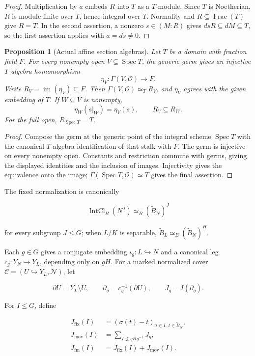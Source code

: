 \documentclass[11pt]{article}
\newtheorem{proposition}[theorem]{Proposition}
\theoremstyle{definition}
\theoremstyle{remark}
\DeclareMathOperator{\Spec}{Spec}
\DeclareMathOperator{\Frac}{Frac}
\begin{document}
\begin{proof}
Multiplication by \(a\) embeds \(R\) into \(T\) as a \(T\)-module.
Since \(T\) is Noetherian, \(R\) is module-finite over \(T\), hence
integral over \(T\). Normality and \(R\subseteq\Frac(T)\) give
\(R=T\). In the second assertion, a nonzero \(s\in(M:R)\) gives
\(dsR\subseteq dM\subseteq T\), so the first assertion applies with
\(a=ds\ne0\).
\end{proof}

\begin{proposition}[Actual affine section algebras]
\label{prop:affine-section-algebra}
Let \(T\) be a domain with fraction field \(F\). For every nonempty
open \(V\subseteq\Spec T\), the generic germ gives an injective
\(T\)-algebra homomorphism
\[
  \eta_V:\Gamma(V,\mathcal O)\longrightarrow F.
\]
Write \(R_V=\operatorname{im}(\eta_V)\subseteq F\). Then
\(\Gamma(V,\mathcal O)\simeq_T R_V\), and \(\eta_V\) agrees with
the given embedding of \(T\). If \(W\subseteq V\) is nonempty,
\[
  \eta_W(s|_W)=\eta_V(s),\qquad R_V\subseteq R_W.
\]
For the full open, \(R_{\Spec T}=T\).
\end{proposition}

\begin{proof}
Compose the germ at the generic point of the integral scheme \(\Spec T\)
with the canonical \(T\)-algebra identification of that stalk with
\(F\). The germ is injective on every nonempty open. Constants and
restriction commute with germs, giving the displayed identities and the
inclusion of images. Injectivity gives the equivalence onto the image;
\(\Gamma(\Spec T,\mathcal O)\simeq T\) gives the final assertion.
\end{proof}

The fixed normalization is canonically

\[
  \operatorname{IntCl}_B(N^J)
  \simeq_B(\widetilde B_N)^J
\]

for every subgroup \(J\leq G\); when \(L/K\) is separable,
\(\widetilde B_L\simeq_B(\widetilde B_N)^H\).

Each \(g\in G\) gives a conjugate embedding \(\iota_g:L\hookrightarrow N\)
and a canonical leg \(c_g:Y_N\to Y_L\), depending only on \(gH\).  For a
marked normalized cover
\(\mathcal C=(U\hookrightarrow Y_L,\mathcal N)\), let

\[
  \partial U=Y_L\setminus U,\qquad
  \partial_g=c_g^{-1}(\partial U),\qquad
  J_g=I(\partial_g).
\]

For \(I\leq G\), define

\begin{align*}
  J_{\mathrm{fix}}(I)
    &=(\sigma(t)-t)_{\sigma\in I,\,t\in\widetilde B_N},\\
  J_{\mathrm{mov}}(I)
    &=\sum_{I\nleq gHg^{-1}}J_g,\\
  J_{\mathrm{fm}}(I)
    &=J_{\mathrm{fix}}(I)+J_{\mathrm{mov}}(I).
\end{align*}
\end{document}
